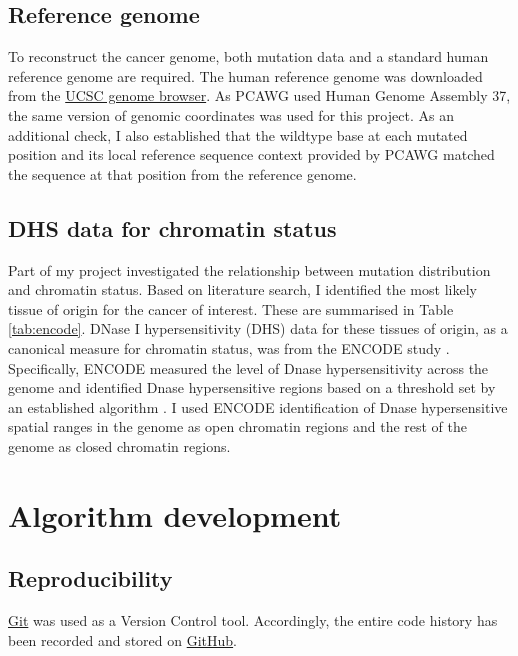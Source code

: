 \subsection{Reference genome} 
To reconstruct the cancer genome, both mutation data and a standard human reference genome are required. The human reference genome was downloaded from the \href{http://hgdownload.soe.ucsc.edu/goldenPath/hg19/chromosomes}{UCSC genome browser}. As PCAWG used Human Genome Assembly 37, the same version of genomic coordinates was used for this project. As an additional check, I also established that the wildtype base at each mutated position and its local reference sequence context provided by PCAWG matched the sequence at that position from the reference genome. 

\subsection{DHS data for chromatin status} 
Part of my project investigated the relationship between mutation distribution and chromatin status. Based on literature search, I identified the most likely tissue of origin for the cancer of interest. These are summarised in Table \ref{tab:encode}. DNase I hypersensitivity (DHS) data for these tissues of origin, as a canonical measure for chromatin status, was from the ENCODE study \citep[downloaded from either \href{https://genome.ucsc.edu/cgi-bin/hgFileUi?db=hg19&g=wgEncodeOpenChromDnase}{Duke} or \href{https://genome.ucsc.edu/cgi-bin/hgFileUi?db=hg19&g=wgEncodeUwDnase}{UW};][]{Thurman2012TheGenome,Klemm2019ChromatinEpigenome}. Specifically, ENCODE measured the level of Dnase hypersensitivity across the genome and identified Dnase hypersensitive regions based on a threshold set by an established algorithm \citep{Boyle2008High-ResolutionGenome}. I used ENCODE identification of Dnase hypersensitive spatial ranges in the genome as open chromatin regions and the rest of the genome as closed chromatin regions.

\section{Algorithm development}
\subsection{Reproducibility} 
\href{http://git-scm.com}{Git} was used as a Version Control tool. Accordingly, the entire code history has been recorded and stored on \href{https://github.com}{GitHub}.

